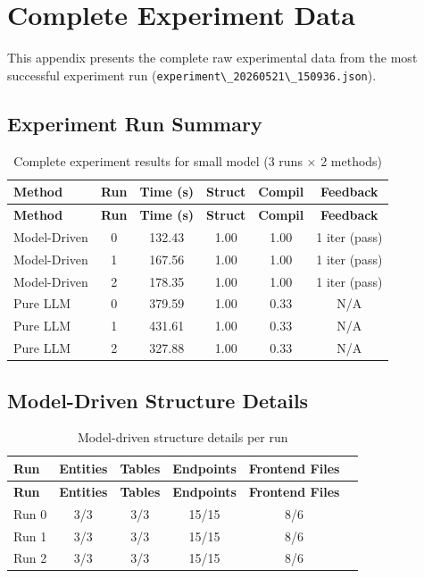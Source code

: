 \documentclass[11pt,a4paper]{article}
\begin{document}
{\newpage
\section{Complete Experiment Data}
\label{sec:experiment-data}

This appendix presents the complete raw experimental data from the most successful experiment run ({\lstinline|experiment\_20260521\_150936.json|}).

\subsection{Experiment Run Summary}

\begin{longtable}{lccccc}
\caption{Complete experiment results for small model (3 runs $\times$ 2 methods)} \\
\toprule
\textbf{Method} & \textbf{Run} & \textbf{Time (s)} & \textbf{Struct} & \textbf{Compil} & \textbf{Feedback} \\
\midrule
\endfirsthead
\toprule
\textbf{Method} & \textbf{Run} & \textbf{Time (s)} & \textbf{Struct} & \textbf{Compil} & \textbf{Feedback} \\
\midrule
\endhead
Model-Driven & 0 & 132.43 & 1.00 & 1.00 & 1 iter (pass) \\
Model-Driven & 1 & 167.56 & 1.00 & 1.00 & 1 iter (pass) \\
Model-Driven & 2 & 178.35 & 1.00 & 1.00 & 1 iter (pass) \\
Pure LLM     & 0 & 379.59 & 1.00 & 0.33 & N/A \\
Pure LLM     & 1 & 431.61 & 1.00 & 0.33 & N/A \\
Pure LLM     & 2 & 327.88 & 1.00 & 0.33 & N/A \\
\bottomrule
\end{longtable}

\subsection{Model-Driven Structure Details}

\begin{longtable}{lccccc}
\caption{Model-driven structure details per run} \\
\toprule
\textbf{Run} & \textbf{Entities} & \textbf{Tables} & \textbf{Endpoints} & \textbf{Frontend Files} \\
\midrule
\endfirsthead
\toprule
\textbf{Run} & \textbf{Entities} & \textbf{Tables} & \textbf{Endpoints} & \textbf{Frontend Files} \\
\midrule
\endhead
Run 0 & 3/3 & 3/3 & 15/15 & 8/6 \\
Run 1 & 3/3 & 3/3 & 15/15 & 8/6 \\
Run 2 & 3/3 & 3/3 & 15/15 & 8/6 \\
\bottomrule
\end{longtable}

}
\end{document}

